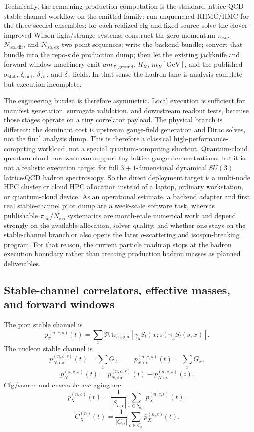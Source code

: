 \documentclass[11pt]{article}
\begin{document}
Technically, the remaining production computation is the standard lattice-QCD stable-channel
workflow on the emitted family: run unquenched RHMC/HMC for the three seeded ensembles; for each
realized cfg and fixed source solve the clover-improved Wilson light/strange systems; construct the
zero-momentum \(\pi_{\mathrm{iso}}\), \(N_{\mathrm{iso,dir}}\), and \(N_{\mathrm{iso,ex}}\)
two-point sequences; write the backend bundle; convert that bundle into the repo-side production
dump; then let the existing jackknife and forward-window machinery emit
\(a m_{X,\mathrm{ground}}\), \(R_X\), \(m_X[\mathrm{GeV}]\), and the published
\(\sigma_{\mathrm{stat}}\), \(\delta_{\mathrm{cont}}\), \(\delta_{\mathrm{vol}}\), and
\(\delta_{\chi}\) fields. In that sense the hadron lane is analysis-complete but
execution-incomplete.

The engineering burden is therefore asymmetric. Local execution is sufficient for manifest
generation, surrogate validation, and downstream readout tests, because those stages operate on a
tiny correlator payload. The physical branch is different: the dominant cost is upstream
gauge-field generation and Dirac solves, not the final analysis dump. This is therefore a classical
high-performance-computing workload, not a special quantum-computing shortcut. Quantum-cloud
quantum-cloud hardware can support toy lattice-gauge demonstrations, but it is not a
realistic execution target for full \(3+1\)-dimensional dynamical \(SU(3)\) lattice-QCD hadron
spectroscopy. So the direct deployment target is a multi-node HPC cluster or cloud HPC allocation
instead of a laptop, ordinary workstation, or quantum-cloud device. As an operational estimate, a backend adapter and first real stable-channel pilot dump
are a week-scale software task, whereas publishable \(\pi_{\mathrm{iso}}/N_{\mathrm{iso}}\)
systematics are month-scale numerical work and depend strongly on the available allocation, solver
quality, and whether one stays on the stable-channel branch or also opens the later
\(\rho\)-scattering and isospin-breaking program. For that reason, the current particle roadmap
stops at the hadron execution boundary rather than treating production hadron masses as planned
deliverables.

\subsection{Stable-channel correlators, effective masses, and forward windows}

The pion stable channel is
\[
p_\pi^{(n,c,s)}(t)
=
\sum_x \Re\,\mathrm{tr}_{c,\mathrm{spin}}
\left[
\gamma_5 S_l(x;s)\gamma_5 S_l(s;x)
\right].
\]
The nucleon stable channel is
\[
p_{N,\mathrm{dir}}^{(n,c,s)}(t) = \sum_x G_d,
\qquad
p_{N,\mathrm{ex}}^{(n,c,s)}(t) = \sum_x G_x,
\]
\[
p_N^{(n,c,s)}(t)
=
p_{N,\mathrm{dir}}^{(n,c,s)}(t) - p_{N,\mathrm{ex}}^{(n,c,s)}(t).
\]
Cfg/source and ensemble averaging are
\[
\bar p_X^{(n,c)}(t)
=
\frac{1}{|S_{n,c}|}\sum_{s\in S_{n,c}} p_X^{(n,c,s)}(t),
\]
\[
C_X^{(n)}(t)
=
\frac{1}{|C_n|}\sum_{c\in C_n} \bar p_X^{(n,c)}(t).
\]
\end{document}
